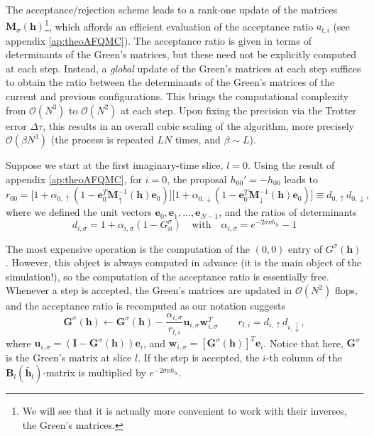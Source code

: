 The acceptance/rejection scheme leads to a rank-one update of the matrices $\bm M_\sigma (\bm h)$\footnote{We will see that it is actually more convenient to work with their inverses, the Green's matrices.}, which affords an efficient evaluation of the acceptance ratio $a_{l, i}$ \cite{hou_numerical_2009} (see appendix \ref{ap:theoAFQMC}).
The acceptance ratio is given in terms of determinants of the Green's matrices, but these need not be explicitly computed at each step.
Instead, a \emph{global} update of the Green's matrices at each step suffices to obtain the ratio between the determinants of the Green's matrices of the current and previous configurations.
This brings the computational complexity from $\mathcal{O}(N^3)$ to $\mathcal{O}(N^2)$ at each step.
Upon fixing the precision via the Trotter error $\Delta \tau$, this results in an overall cubic scaling of the algorithm, more precisely $\mathcal{O}(\beta N^3)$ (the process is repeated $L N$ times, and $\beta \sim L$).

Suppose we start at the first imaginary-time slice, $l = 0$.
Using the result of appendix \ref{ap:theoAFQMC}, for $i = 0$, the proposal $h_{0 0}' = - h_{0 0}$ leads to
\begin{equation}
r_{0 0} = \bigg[ 1 + \alpha_{0, \uparrow} ( 1 - \bm e_0^T \bm M_\uparrow^{-1} ( \bm h ) \bm e_0 ) \bigg] \bigg[ 1 + \alpha_{0, \downarrow} ( 1 - \bm e_0^T \bm M_\downarrow^{-1} ( \bm h ) \bm e_0 ) \bigg] \equiv d_{0, \uparrow} d_{0, \downarrow} ,
\end{equation}
where we defined the unit vectors $\bm e_0, \bm e_1, ..., \bm e_{N-1}$, and the ratios of determinants
\begin{equation*}
d_{i, \sigma} = 1 + \alpha_{i, \sigma} ( 1 - G^\sigma_{i i} ) \quad \text{with} \quad \alpha_{i, \sigma} = e^{-2 \sigma \nu h_{l i}} - 1
\end{equation*}

The most expensive operation is the computation of the $(0, 0)$ entry of $G^\sigma (\bm h)$.
However, this object is always computed in advance (it is the main object of the simulation!), so the computation of the acceptance ratio is essentially free.
Whenever a step is accepted, the Green's matrices are updated in $\mathcal{O}(N^2)$ flops, and the acceptance ratio is recomputed as our notation suggests
\begin{equation}\label{eq:updates}
\bm G^\sigma ( \bm h ) \leftarrow \bm G^\sigma ( \bm h ) - \frac{\alpha_{i, \sigma}}{r_{l, i}} \bm u_{i, \sigma} \bm w_{i, \sigma}^T \quad \quad r_{l,i} = d_{i, \uparrow} d_{i, \downarrow} ,
\end{equation}
where $\bm u_{i, \sigma} = ( \bm I - \bm G^\sigma ( \bm h ) ) \bm e_i$, and $\bm w_{i, \sigma} = [ \bm G^\sigma (\bm h) ]^T \bm e_i$.
Notice that here, $\bm G^\sigma$ is the Green's matrix at slice $l$.
If the step is accepted, the $i$-th column of the $\bm B_l ( \widetilde{\bm h_l} )$-matrix is multiplied by $e^{-2 \sigma \nu h_{l i}}$.

